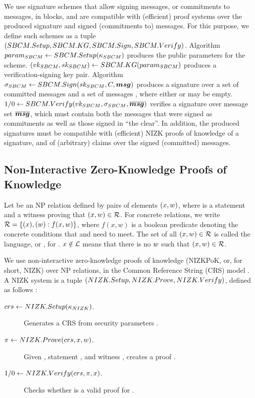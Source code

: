 We use signature schemes that allow signing messages, or commitments to messages,
in blocks, and are compatible with (efficient) proof systems over the produced
signature and signed (commitments to) messages. For this purpose, we define such
schemes as a tuple $(SBCM.Setup,SBCM.KG,SBCM.Sign,SBCM.Verify)$. Algorithm
$param_{SBCM} \gets SBCM.Setup(\kappa_{SBCM})$ produces the public parameters for the
scheme. $(vk_{SBCM},sk_{SBCM}) \gets SBCM.KG(param_{SBCM})$ produces a
verification-signing key
pair. Algorithm $\sigma_{SBCM} \gets SBCM.Sign(sk_{SBCM},C,\boldsymbol{msg})$ produces a
signature over a set of committed messages \Ccom and a set of messages
\msgset, where either \Ccom or \msgset may be empty. $1/0 \gets
SBCM.Verify(vk_{SBCM},\sigma_{SBCM},\overline{\boldsymbol{msg}})$ verifies a signature \SBCMsig
over message set $\overline{\boldsymbol{msg}}$, which must contain both the messages that
were signed as commitments as well as those signed in ``the clear''. In
addition, the produced signatures must be compatible with (efficient) NIZK
proofs of knowledge of a signature, and of (arbitrary) claims over the signed
(committed) messages.

\subsection{Non-Interactive Zero-Knowledge Proofs of Knowledge}
\label{sapp:nizk}

Let \NIZKRel be an NP relation defined by pairs of elements $(x,w)$,
where \NIZKx is a statement and \NIZKw a witness proving that $(x,w)
\in \mathcal{R}$. For concrete relations, we write $\mathcal{R} = \lbrace (x),
(w): f(x,w) \rbrace$, where $f(x,w)$ is a boolean predicate denoting the
concrete conditions that \NIZKx and \NIZKw need to meet. The set of all $(x,
w) \in \mathcal{R}$ is called the language, or \NIZKLang, for \NIZKRel.
$x \notin \mathcal{L}$ means that there is no $w$ such that $(x,
w) \in \mathcal{R}$. 

We use non-interactive zero-knowledge proofs of knowledge (NIZKPoK, or, for
short, NIZK) over NP relations, in the Common Reference String (CRS) model
\needcite. A NIZK system is a tuple $(NIZK.Setup,NIZK.Prove,NIZK.Verify)$,
defined as follows \cite{gos06}:

\begin{description}
\item[$crs \gets NIZK.Setup(\kappa_{NIZK})$.] Generates a CRS \NIZKcrs from
  security parameters \NIZKsecpar.
\item[$\pi \gets NIZK.Prove(crs,x,w)$.] Given \NIZKcrs,
  statement \NIZKx, and witness \NIZKw, creates a proof \NIZKproof.
\item[$1/0 \gets NIZK.Verify(crs,\pi,x)$.] Checks whether
  \NIZKproof is a valid proof for \NIZKx.
\end{description}

